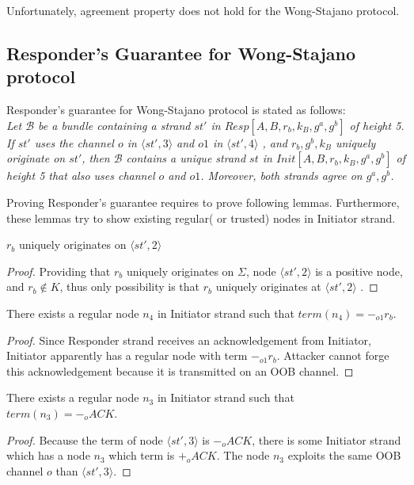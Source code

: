 Unfortunately, agreement property does not hold for the Wong-Stajano protocol. 

\subsection{Responder's Guarantee for Wong-Stajano protocol} 

Responder's guarantee for Wong-Stajano protocol is stated as follows:\\
\textit{Let $\mathcal{B}$ be a bundle containing a strand $st'$ in $Resp[A,B,r_b, k_B,g^a,g^b]$ of height 5. If $st'$ uses the channel $o$ in $\langle st',3 \rangle$ and $o1$ in $\langle st',4 \rangle$ , and $r_b, g^b, k_B$ uniquely originate on $st'$, then $\mathcal{B}$ contains a unique strand $st$ in $Init[A,B,r_b, k_B,g^a,g^b]$ of height 5 that also uses channel $o$ and $o1$. Moreover, both strands agree on $g^a,g^b$.}

Proving Responder's guarantee requires to prove following lemmas. Furthermore, these lemmas try to show existing regular( or trusted) nodes in Initiator strand.  

\begin{Lemma}
$r_b$ uniquely originates on $\langle st',2 \rangle$ 
\end{Lemma}
\begin{proof}
Providing that $r_b$ uniquely originates on $\Sigma$, node $\langle st',2 \rangle $ is a positive node, and $r_b \not\in K$, thus only possibility is that $r_b$ uniquely originates at $\langle st',2 \rangle$ .
\end{proof}

\begin{Lemma}
There exists a regular node $n_4$ in Initiator strand such that $term(n_4) = -_{o1} r_b$.
\end{Lemma}
\begin{proof}
Since Responder strand receives an acknowledgement from Initiator, Initiator apparently has a regular node with term $-_{o1} r_b$. Attacker cannot forge this acknowledgement because it is transmitted on an OOB channel. 
\end{proof}

\begin{Lemma}
There exists a regular node $n_3$ in Initiator strand such that $term(n_3) = -_o ACK$.
\end{Lemma}
\begin{proof}
Because the term of node $\langle st',3 \rangle$ is $-_o ACK$, there is some Initiator strand which has a node $n_3$ which term is $+_o ACK$. The node $n_3$ exploits the same OOB channel $o$ than $\langle st',3 \rangle$.
\end{proof}


